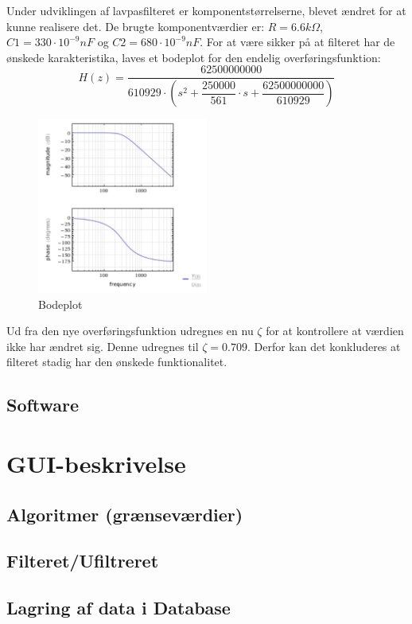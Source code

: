 Under udviklingen af lavpasfilteret er komponentstørrelserne, blevet ændret for at kunne realisere det. De brugte komponentværdier er: $ R= 6.6 k\Omega $, $ C1= 330\cdot 10 ^{-9} nF$ og $ C2= 680\cdot 10^{-9} nF$.   
For at være sikker på at filteret har de ønskede karakteristika, laves et bodeplot for den endelig overføringsfunktion: 
\begin{equation}
H(z)=\dfrac{62500000000}{610929\cdot \left( s^2+\dfrac{250000}{561}\cdot s + \dfrac{62500000000}{610929} \right)}
\end{equation}
\begin{figure}[H]
	\centering
	\includegraphics[width=0.5\textwidth]{Figurer/Bodeplot}
	\caption{Bodeplot}
	\label{fig:bodeplot}
\end{figure}
Ud fra den nye overføringsfunktion udregnes en nu $ \zeta $ for at kontrollere at værdien ikke har ændret sig. Denne udregnes til $ \zeta = 0.709 $. Derfor kan det konkluderes at filteret stadig har den ønskede funktionalitet. 

\subsection{Software}

\section{GUI-beskrivelse}
\subsection{Algoritmer (grænseværdier)}
\subsection{Filteret/Ufiltreret}
\subsection{Lagring af data i Database}

